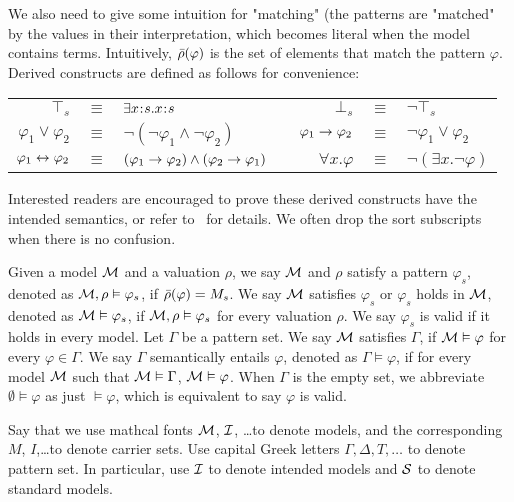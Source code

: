 {
We also need to give some intuition for "matching" 
(the patterns are "matched" 
by the values in their interpretation, 
which becomes literal when the model contains terms.
}
Intuitively,
$\bar{\rho}(\varphi)$ 
is the set of elements that match the pattern $\varphi$.
Derived constructs are defined as follows for convenience:
\begin{center}
\begin{tabular}{rclp{1cm}rcl}
$\top_s$ & $\equiv$ & $\exists x \mathbin{\!:\!} s . x \mathbin{\!:\!} s$
&&
$\bot_s$ & $\equiv$ & $\neg \top_s$
\\
$\varphi_1 \vee \varphi_2$ & $\equiv$ & 
$\neg (\neg \varphi_1 \wedge \neg \varphi_2)$
&&
$\varphi_1 \to \varphi_2$ & $\equiv$ &
$\neg \varphi_1 \vee \varphi_2$
\\
$\varphi_1 \leftrightarrow \varphi_2$ & $\equiv$ &
$(\varphi_1 \to \varphi_2) \wedge (\varphi_2 \to \varphi_1)$
&&
$\forall x . \varphi$ & $\equiv$ &
$\neg (\exists x . \neg \varphi)$
\end{tabular}
\end{center}
Interested readers are encouraged to prove these derived constructs
have the intended semantics,
or refer to~\cite{bibid} for details.
We often drop the sort subscripts when there is no confusion.

Given a model $\mathcal{M}$ and a valuation $\rho$,
we say $\mathcal{M}$ and $\rho$ satisfy a pattern $\varphi_s$,
denoted as $\mathcal{M},\rho \vDash \varphi_s$,
if $\bar{\rho}(\varphi) = M_s$.
We say $\mathcal{M}$ satisfies $\varphi_s$
or $\varphi_s$ holds in $\mathcal{M}$,
denoted as $\mathcal{M} \vDash \varphi_s$,
if $\mathcal{M} , \rho \vDash \varphi_s$ for every valuation $\rho$.
We say $\varphi_s$ is valid if
it holds in every model.
Let $\Gamma$ be a pattern set.
We say $\mathcal{M}$ satisfies $\Gamma$, if
$\mathcal{M} \vDash \varphi$ for every $\varphi \in \Gamma$.
We say $\Gamma$ semantically entails $\varphi$,
denoted as $\Gamma \vDash \varphi$,
if for every model $\mathcal{M}$ such that $\mathcal{M} \vDash \Gamma$,
$\mathcal{M} \vDash \varphi$.
When $\Gamma$ is the empty set, we abbreviate
$\emptyset \vDash \varphi$ as just $\vDash \varphi$,
which is equivalent to say $\varphi$ is valid.

{
Say that we use mathcal fonts ${\mathcal{M}}$, ${\mathcal{I}}$, \dots to denote models,
and the corresponding $M$, $I$,\dots to denote carrier sets.
Use capital Greek letters $\Gamma, \Delta, T, \dots$ to denote pattern set.
In particular, use $\mathcal{I}$ to denote intended models and
$\mathcal{S}$ to denote standard models.
}

